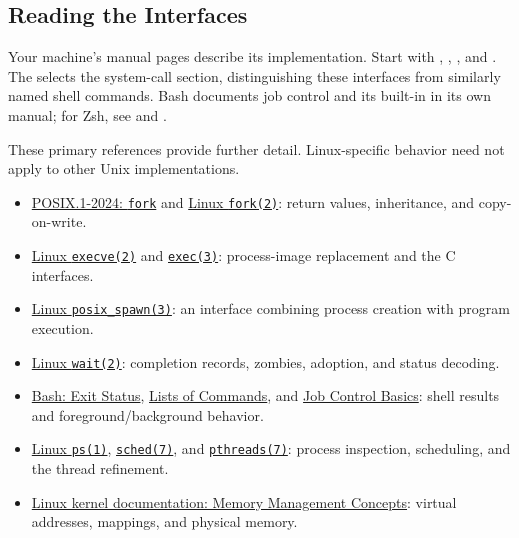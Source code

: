 \documentclass[11pt]{article}
\begin{document}
\subsection*{Reading the Interfaces}

Your machine's manual pages describe its implementation.
Start with , , , and .
The  selects the system-call section, distinguishing these interfaces from similarly named shell commands.
Bash documents job control and its  built-in in its own manual; for Zsh, see  and .

These primary references provide further detail.
Linux-specific behavior need not apply to other Unix implementations.

\small

\begin{itemize}
\item \href{https://pubs.opengroup.org/onlinepubs/9799919799/functions/fork.html}{POSIX.1-2024: \texttt{fork}} and \href{https://man7.org/linux/man-pages/man2/fork.2.html}{Linux \texttt{fork(2)}}: return values, inheritance, and copy-on-write.
\item \href{https://man7.org/linux/man-pages/man2/execve.2.html}{Linux \texttt{execve(2)}} and \href{https://man7.org/linux/man-pages/man3/exec.3.html}{\texttt{exec(3)}}: process-image replacement and the C interfaces.
\item \href{https://man7.org/linux/man-pages/man3/posix_spawn.3.html}{Linux \texttt{posix\_spawn(3)}}: an interface combining process creation with program execution.
\item \href{https://man7.org/linux/man-pages/man2/wait.2.html}{Linux \texttt{wait(2)}}: completion records, zombies, adoption, and status decoding.
\item \href{https://www.gnu.org/software/bash/manual/html_node/Exit-Status.html}{Bash: Exit Status}, \href{https://www.gnu.org/software/bash/manual/html_node/Lists.html}{Lists of Commands}, and \href{https://www.gnu.org/software/bash/manual/html_node/Job-Control-Basics.html}{Job Control Basics}: shell results and foreground/background behavior.
\item \href{https://man7.org/linux/man-pages/man1/ps.1.html}{Linux \texttt{ps(1)}}, \href{https://man7.org/linux/man-pages/man7/sched.7.html}{\texttt{sched(7)}}, and \href{https://man7.org/linux/man-pages/man7/pthreads.7.html}{\texttt{pthreads(7)}}: process inspection, scheduling, and the thread refinement.
\item \href{https://docs.kernel.org/admin-guide/mm/concepts.html}{Linux kernel documentation: Memory Management Concepts}: virtual addresses, mappings, and physical memory.
\end{itemize}
\end{document}
